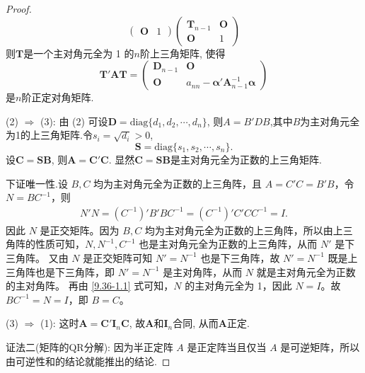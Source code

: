 \documentclass[../../main.tex]{subfiles}
\begin{document}
\begin{proof}
\[\begin{pmatrix}
\boldsymbol{O} & 1
\end{pmatrix}
\begin{pmatrix}
\boldsymbol{T}_{n - 1} & \boldsymbol{O} \\
\boldsymbol{O} & 1
\end{pmatrix}
\]
则$\boldsymbol{T}$是一个主对角元全为 1 的$n$阶上三角矩阵, 使得
\[
\boldsymbol{T}'\boldsymbol{A}\boldsymbol{T}=\begin{pmatrix}
\boldsymbol{D}_{n - 1} & \boldsymbol{O} \\
\boldsymbol{O} & a_{nn}-\boldsymbol{\alpha}'\boldsymbol{A}_{n - 1}^{-1}\boldsymbol{\alpha}
\end{pmatrix}
\]
是$n$阶正定对角矩阵.

(2) $\Rightarrow$ (3): 由 (2) 可设$\boldsymbol{D}=\text{diag}\{d_1, d_2, \cdots, d_n\}$, 则$A=B'DB$,其中$B$为主对角元全为1的上三角矩阵.令$s_i = \sqrt{d_i}>0$,
\[
\boldsymbol{S}=\text{diag}\{s_1, s_2, \cdots, s_n\}.
\]
设$\boldsymbol{C}=\boldsymbol{S}\boldsymbol{B}$, 则$\boldsymbol{A}=\boldsymbol{C}'\boldsymbol{C}$. 显然$\boldsymbol{C}=\boldsymbol{S}\boldsymbol{B}$是主对角元全为正数的上三角矩阵.

下证唯一性.设 \(B,C\) 均为主对角元全为正数的上三角阵，且 \(A = C'C = B'B\)，令 \(N = BC^{-1}\)，则
\begin{align}
N'N = \left( C^{-1} \right)'B'BC^{-1} = \left( C^{-1} \right)'C'CC^{-1} = I. \label{9.36-1.1}
\end{align}
因此 \(N\) 是正交矩阵。因为 \(B,C\) 均为主对角元全为正数的上三角阵，所以由上三角阵的性质可知，\(N,N^{-1},C^{-1}\) 也是主对角元全为正数的上三角阵，从而 \(N'\) 是下三角阵。
又由 \(N\) 是正交矩阵可知 \(N' = N^{-1}\) 也是下三角阵，故 \(N' = N^{-1}\) 既是上三角阵也是下三角阵，即 \(N' = N^{-1}\) 是主对角阵，从而 \(N\) 就是主对角元全为正数的主对角阵。
再由 \eqref{9.36-1.1} 式可知，\(N\) 的主对角元全为 1，因此 \(N = I\)。故 \(BC^{-1} = N = I\)，即 \(B = C\)。

(3) $\Rightarrow$ (1): 这时$\boldsymbol{A}=\boldsymbol{C}'\boldsymbol{I}_n\boldsymbol{C}$, 故$\boldsymbol{A}$和$\boldsymbol{I}_n$合同, 从而$\boldsymbol{A}$正定.

{\color{blue}证法二(矩阵的QR分解):}
因为半正定阵 $A$ 是正定阵当且仅当 $A$ 是可逆矩阵，所以由可逆性和的结论就能推出的结论.
\end{proof}
\end{document}
